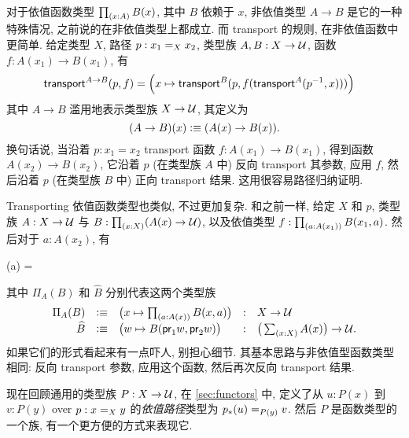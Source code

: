 对于依值函数类型 $\prd{x:A} B(x)$, 其中 $B$ 依赖于 $x$, 非依值类型 $A\to B$ 是它的一种特殊情况, 之前说的在非依值类型上都成立.
%
而 transport 的规则, 在非依值函数中更简单.
给定类型 $X$, 路径 $p:\id[X]{x_1}{x_2}$, 类型族 $A,B:X\to \type$, 函数 $f : A(x_1) \to B(x_1)$, 有
\begin{align}
  \label{eq:transport-arrow}
  \transfib{A\to B}{p}{f} &=
  \Big(x \mapsto \transfib{B}{p}{f(\transfib{A}{\opp p}{x})}\Big)
\end{align}
其中 $A\to B$ 滥用地表示类型族 $X\to \type$, 其定义为
\[
  (A\to B)(x) \defeq (A(x)\to B(x)).
\]
换句话说, 当沿着 $p:x_1=x_2$ transport 函数 $f:A(x_1)\to B(x_1)$, 得到函数 $A(x_2)\to B(x_2)$, 它沿着 $p$ (在类型族 $A$ 中) 反向 transport 其参数, 应用 $f$, 然后沿着 $p$ (在类型族 $B$ 中) 正向 transport 结果.
这用很容易路径归纳证明.

%
Transporting 依值函数类型也类似, 不过更加复杂.
和之前一样, 给定 $X$ 和 $p$, 类型族 $A:X\to \type$ 与 $B:\prd{x:X} (A(x)\to\type)$, 以及依值类型 $f : \prd{a:A(x_1)} B(x_1,a)$.
然后对于 $a:A(x_2)$, 有
\begin{narrowmultline*}
  (a) = \narrowbreak
\end{narrowmultline*}
其中 $\Pi_A(B)$ 和 $\widehat{B}$ 分别代表这两个类型族
\begin{equation}\label{eq:transport-arrow-families}
\begin{array}{rclcl}
\Pi_A(B) &\defeq& \big(x\mapsto \prd{a:A(x)} B(x,a) \big) &:& X\to \type\\
\widehat{B} &\defeq& \big(w \mapsto B(\proj1w,\proj2w) \big) &:& \big(\sm{x:X} A(x)\big) \to \type.
\end{array}
\end{equation}
如果它们的形式看起来有一点吓人, 别担心细节.
其基本思路与非依值型函数类型相同: 反向 transport 参数, 应用这个函数, 然后再次反向 transport 结果.

现在回顾通用的类型族 $P:X\to\type$, 在 \cref{sec:functors} 中, 定义了从 $u:P(x)$ 到 $v:P(y)$ over $p:\id[X]xy$ 的\emph{依值路径}类型为 $\id[P(y)]{\trans{p}{u}}{v}$.
然后 $P$ 是函数类型的一个族, 有一个更方便的方式来表现它.

